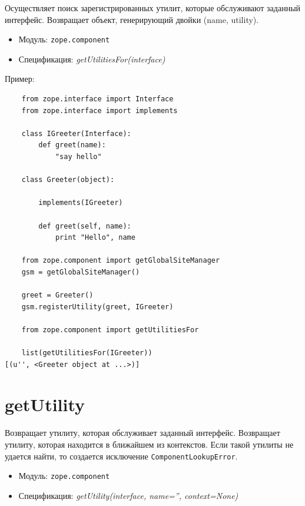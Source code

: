 \documentclass[a4paper,openany,twoside,final]{book}
\providecommand*{\DUroletitlereference}[1]{\textsl{#1}}
\begin{document}
Осуществляет поиск зарегистрированных утилит, которые обслуживают заданный интерфейс.  Возвращает объект, генерирующий двойки (name, utility).

\begin{itemize}

\item Модуль: \texttt{zope.component}

\item Спецификация: \DUroletitlereference{getUtilitiesFor(interface)}

\end{itemize}

Пример:

\begin{verbatim}
    from zope.interface import Interface
    from zope.interface import implements

    class IGreeter(Interface):
        def greet(name):
            "say hello"

    class Greeter(object):

        implements(IGreeter)

        def greet(self, name):
            print "Hello", name

    from zope.component import getGlobalSiteManager
    gsm = getGlobalSiteManager()

    greet = Greeter()
    gsm.registerUtility(greet, IGreeter)

    from zope.component import getUtilitiesFor

    list(getUtilitiesFor(IGreeter))
[(u'', <Greeter object at ...>)]
\end{verbatim}


\section*{getUtility%
  \label{getutility}%
}

Возвращает утилиту, которая обслуживает заданный интерфейс.  Возвращает утилиту, которая находится в ближайшем из контекстов.  Если такой утилиты не удается найти, то создается исключение \texttt{ComponentLookupError}.

\begin{itemize}

\item Модуль: \texttt{zope.component}

\item Спецификация: \DUroletitlereference{getUtility(interface, name='', context=None)}

\end{itemize}
\end{document}
